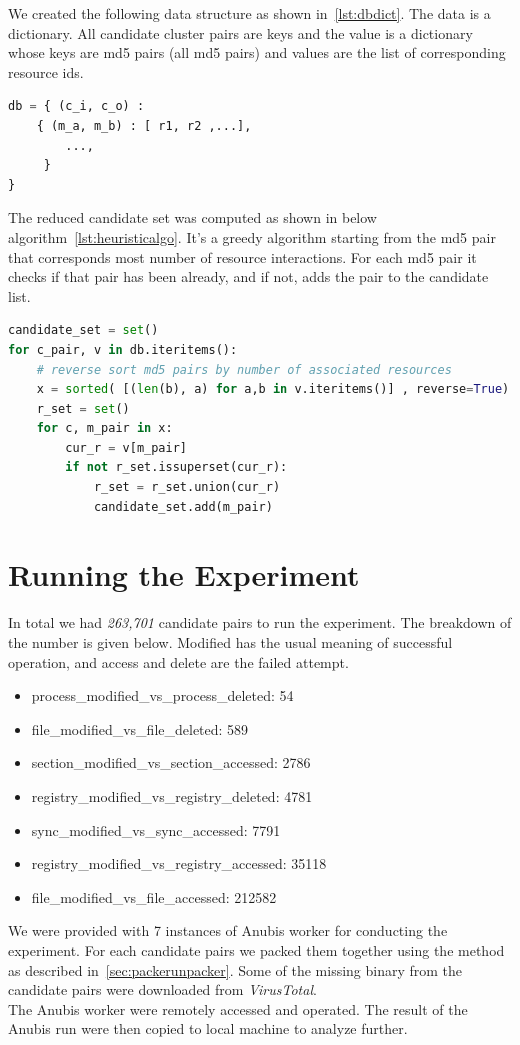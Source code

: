 We created the following data structure as shown in~\ref{lst:dbdict}.
The data is a dictionary. All candidate cluster pairs are keys and the value is a dictionary whose keys are md5 pairs (all md5 pairs) and values are the list of corresponding resource ids.
\begin{lstlisting}[language=python,floatplacement=H,caption={Database Structure},label={lst:dbdict}]
db = { (c_i, c_o) :
    { (m_a, m_b) : [ r1, r2 ,...],
        ...,
     }
}
\end{lstlisting}
The reduced candidate set was computed as shown in below algorithm~\ref{lst:heuristicalgo}.
It's a greedy algorithm starting from the md5 pair that corresponds most number of resource interactions.
For each md5 pair it checks if that pair has been already, and if not, adds the pair to the candidate list.
\begin{lstlisting}[float,floatplacement=htbp,language=python,caption={Alogrithm to get minimal set of candidates for all resource},label={lst:heuristicalgo}]
candidate_set = set()
for c_pair, v in db.iteritems():
    # reverse sort md5 pairs by number of associated resources
    x = sorted( [(len(b), a) for a,b in v.iteritems()] , reverse=True)
    r_set = set()
    for c, m_pair in x:
        cur_r = v[m_pair]
        if not r_set.issuperset(cur_r):
            r_set = r_set.union(cur_r)
            candidate_set.add(m_pair)
\end{lstlisting}
\section{Running the Experiment}
\label{sec:Running the Experiment}
In total we had \emph{263,701} candidate pairs to run the experiment.
The breakdown of the number is given below.
Modified has the usual meaning of successful operation, and access and delete are the failed attempt.
\begin{itemize}
  \item process\_modified\_vs\_process\_deleted: 54
  \item file\_modified\_vs\_file\_deleted: 589
  \item section\_modified\_vs\_section\_accessed: 2786
  \item registry\_modified\_vs\_registry\_deleted: 4781
  \item sync\_modified\_vs\_sync\_accessed: 7791
  \item registry\_modified\_vs\_registry\_accessed: 35118
  \item file\_modified\_vs\_file\_accessed: 212582
\end{itemize}
We were provided with 7 instances of Anubis worker for conducting the experiment.
For each candidate pairs we packed them together using the method as described in~\ref{sec:packerunpacker}.
Some of the missing binary from the candidate pairs were downloaded from \emph{VirusTotal}.\\
The Anubis worker were remotely accessed and operated. The result of the Anubis run were then copied to local machine to analyze further.
